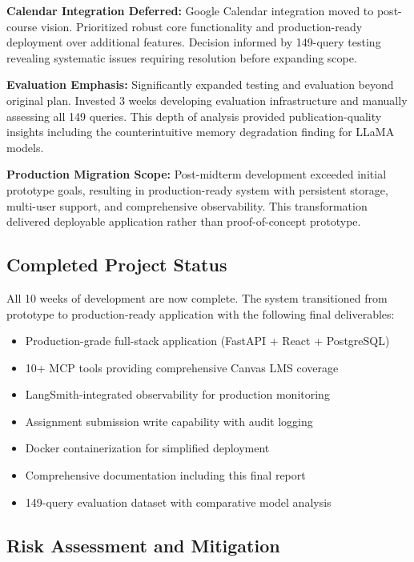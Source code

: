 \documentclass{article}
\begin{document}
\textbf{Calendar Integration Deferred:} Google Calendar integration moved to post-course vision. Prioritized robust core functionality and production-ready deployment over additional features. Decision informed by 149-query testing revealing systematic issues requiring resolution before expanding scope.

\textbf{Evaluation Emphasis:} Significantly expanded testing and evaluation beyond original plan. Invested 3 weeks developing evaluation infrastructure and manually assessing all 149 queries. This depth of analysis provided publication-quality insights including the counterintuitive memory degradation finding for LLaMA models.

\textbf{Production Migration Scope:} Post-midterm development exceeded initial prototype goals, resulting in production-ready system with persistent storage, multi-user support, and comprehensive observability. This transformation delivered deployable application rather than proof-of-concept prototype.

\subsection{Completed Project Status}

All 10 weeks of development are now complete. The system transitioned from prototype to production-ready application with the following final deliverables:

\begin{itemize}
    \item Production-grade full-stack application (FastAPI + React + PostgreSQL)
    \item 10+ MCP tools providing comprehensive Canvas LMS coverage
    \item LangSmith-integrated observability for production monitoring
    \item Assignment submission write capability with audit logging
    \item Docker containerization for simplified deployment
    \item Comprehensive documentation including this final report
    \item 149-query evaluation dataset with comparative model analysis
\end{itemize}

\subsection{Risk Assessment and Mitigation}
\end{document}
